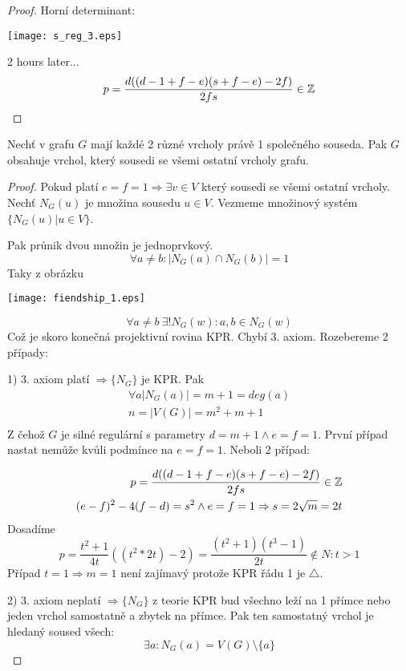 \begin{proof}
	Horní determinant:

	\texttt{[image: s\_reg\_3.eps]}

	2 hours later...
	\[ p = \frac{d((d - 1 + f - e)(s + f - e) - 2f)}{2fs} \in \operatorname{\mathbb{Z}} \]
\end{proof}

\begin{theorem}
	Nechť v grafu $G$ mají každé 2 různé vrcholy právě 1 společného souseda.
	Pak $G$ obsahuje vrchol, který sousedi se všemi ostatní vrcholy grafu.
\end{theorem}
\begin{proof}
	Pokud platí $ e = f = 1 \Rightarrow \exists v \in V$ který sousedi se všemi ostatní vrcholy. \\
	Nechť $N_G(u)$ je množina sousedu $u \in V$. Vezmeme množinový systém $\{ N_G(u) | u \in V \}$.

	Pak průnik dvou množin je jednoprvkový.
	\[ \forall a \ne b: |N_G(a) \cap N_G(b)| = 1 \]
	Taky z obrázku

	\texttt{[image: fiendship\_1.eps]}

	\[ \forall a \ne b\ \exists! N_G(w): a,b \in N_G(w) \]
	Což je skoro konečná projektivní rovina KPR. Chybí 3. axiom. Rozebereme 2 případy:

	1) 3. axiom platí $\Rightarrow \{N_G\}$ je KPR. Pak
	\begin{equation*}
	\begin{split}
		\forall a |N_G(a)| = m + 1 = deg(a) \\
		n = |V(G)| = m^2 + m + 1\\
	\end{split}
	\end{equation*}
	Z čehož $G$ je silné regulární s parametry $ d = m + 1 \land e = f = 1$. První případ nastat nemůže kvůli podmínce na $e = f = 1$. Neboli 2 případ:

	\begin{equation*}
	\begin{aligned}
		p = \frac{d((d - 1 + f - e)(s + f - e) - 2f)}{2fs} \in \operatorname{\mathbb{Z}} \\
		(e - f)^2 - 4 (f - d) = s^2 \land e = f = 1 \Rightarrow s = 2 \sqrt{m} = 2t
	\end{aligned}
	\end{equation*}
	Dosadíme
	\[ p = \frac{t^2 + 1}{4t}((t^2 * 2t) - 2) = \frac{(t^2 + 1)(t^3 - 1)}{2t} \notin N : t > 1 \]
	Případ $t = 1 \Rightarrow m = 1$ není zajímavý protože KPR řádu 1 je $\triangle$.

	2) 3. axiom neplatí $\Rightarrow \{N_G\}$ z teorie KPR bud všechno leží na 1 přímce nebo jeden vrchol samostatně a zbytek na přímce. Pak ten samostatný vrchol je hledaný soused všech:
	\[ \exists a : N_G(a) = V(G)\setminus \{a\} \]

\end{proof}
